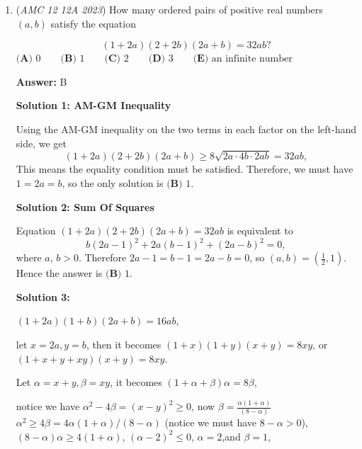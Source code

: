 \begin{enumerate}
 First, subtract by 17 times $f(119)+7f(17)+17f(7)+119f(1)=1$ to get

 $f(2023)+7f(289)=-16$

 Then, subtract by 7 times $f(289)+17f(17)+289f(1)=1$ to get

 $f(2023)-119f(17)-2023f(1)=-23$

 Then finally, add by 119 times $f(7)+7f(1)=1$ to then get $f(2023) = 119-23 = \boxed{\textbf{(B)} \ 96}$

 -Polyline

 \href{https://YouTube.com/watch?v=gdhVqdRhMsQ}{https://YouTube.com/watch?v=gdhVqdRhMsQ}

 


	\item (\textit{AMC 12 12A 2023}) How many ordered pairs of positive real numbers $(a,b)$ satisfy the equation

 \[(1+2a)(2+2b)(2a+b) = 32ab?\]
$\textbf{(A) }0\qquad\textbf{(B) }1\qquad\textbf{(C) }2\qquad\textbf{(D) }3\qquad\textbf{(E) }\text{an infinite number}$

 \textbf{Answer: }B



\textbf{Solution 1: AM-GM Inequality}

Using the AM-GM inequality on the two terms in each factor on the left-hand side, we get
 \[(1+2a)(2+2b)(2a+b) \ge 8\sqrt{2a \cdot 4b \cdot 2ab}= 32ab,\]This means the equality condition must be satisfied. Therefore, we must have $1 = 2a = b$, so the only solution is $\boxed{\textbf{(B) }1}$.

 



\textbf{Solution 2: Sum Of Squares}

Equation $(1+2a)(2+2b)(2a+b)=32ab$ is equivalent to
 \[b(2a-1)^2+2a(b-1)^2+(2a-b)^2=0,\]where $a$, $b>0$. Therefore $2a-1=b-1=2a-b=0$, so $(a,b)=\left(\frac12,1\right)$. Hence the answer is $\boxed{\textbf{(B) }1}$.

 


 



\textbf{Solution 3:}

$(1+2a)(1+b)(2a+b)=16ab$,

 let $x=2a, y=b$, then it becomes $(1+x)(1+y)(x+y)=8xy$, or $(1+x+y+xy)(x+y)=8xy$.

 Let $\alpha=x+y, \beta=xy$, it becomes $(1+\alpha+\beta)\alpha=8\beta$,

 notice we have $\alpha^2-4\beta=(x-y)^2\ge 0$, now $\beta= \frac{\alpha(1+\alpha)}{(8-\alpha)}$
$\alpha^2\ge 4\beta=4\alpha(1+\alpha)/(8-\alpha)$ (notice we must have $8-\alpha>0$), $(8-\alpha)\alpha\ge 4(1+\alpha)$, $(\alpha-2)^2\le 0$, $\alpha=2$,and $\beta=1$, 


\end{enumerate}
